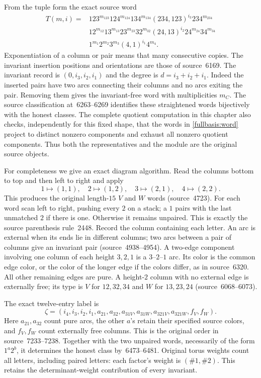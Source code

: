 From the tuple form the exact source word
\begin{equation}\label{fullbasis:word}
\begin{aligned}
 T(m,i)={}&123^{m_{123}}124^{m_{124}}134^{m_{134}}
 (234,123)^{i_3}234^{m_{234}}\\[-1mm]
 &12^{m_{12}}13^{m_{13}}23^{m_{23}}32^{m_{32}}
 (24,13)^{i_2}24^{m_{24}}34^{m_{34}}\\[-1mm]
 &1^{m_1}2^{m_2}3^{m_3}(4,1)^{i_1}4^{m_4}.
\end{aligned}
\end{equation}
Exponentiation of a column or pair means that many consecutive copies.
The invariant insertion positions and orientations are those of
source~6169.  The invariant record is $(0,i_3,i_2,i_1)$ and the degree
is $d=i_3+i_2+i_1$.  Indeed the inserted pairs have two arcs connecting
their columns and no arcs exiting the pair.  Removing them gives the
invariant-free word with multiplicities $m_C$.  The source classification
at~6263--6269 identifies these straightened words bijectively with the
honest classes.  The complete quotient computation in this chapter also
checks, independently for this fixed shape, that the words in
\eqref{fullbasis:word} project to distinct nonzero components and exhaust
all nonzero quotient components.  Thus both the representatives and the
module are the original source objects.

For completeness we give an exact diagram algorithm.  Read the columns
bottom to top and then left to right and apply
\[
 1\mapsto(1,1),\quad2\mapsto(1,2),\quad
 3\mapsto(2,1),\quad4\mapsto(2,2).
\]
This produces the original length-$15$ $V$ and $W$ words (source~4723).
For each word scan left to right, pushing every $2$ on a stack; a $1$
pairs with the last unmatched $2$ if there is one.  Otherwise it remains
unpaired.  This is exactly the source parenthesis rule~2448.  Record the
column containing each letter.  An arc is external when its ends lie in
different columns; two arcs between a pair of columns give an invariant
pair (source~4938--4954).  A two-edge component involving one column of
each height $3,2,1$ is a $3$--$2$--$1$ arc.  Its color is the common
edge color, or the color of the longer edge if the colors differ, as in
source~6320.  All other remaining edges are pure.  A height-$2$ column
with no external edge is externally free; its type is $V$ for
$12,32,34$ and $W$ for $13,23,24$ (source~6068--6073).

The exact twelve-entry label is
\begin{equation}\label{fullbasis:zeta}
 \zeta=(i_4,i_3,i_2,i_1,a_{21},a_{32},a_{31V},a_{31W},
                 a_{321V},a_{321W},f_V,f_W).
\end{equation}
Here $a_{21},a_{32}$ count pure arcs, the other $a$'s retain their
specified source colors, and $f_V,f_W$ count externally free columns.
This is the original order in source~7233--7238.  Together with the two
unpaired words, necessarily of the form $1^a2^b$, it determines the
honest class by~6473--6481.  Original torus weights count all letters,
including paired letters: each factor's weight is
$(\#1,\#2)$.  This retains the determinant-weight contribution of every
invariant.

